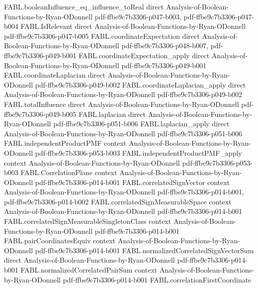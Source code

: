 \begin{theorem}
\proofstep
  {FABL.booleanInfluence_eq_influence_toReal}
  {direct}
  {Analysis-of-Boolean-Functions-by-Ryan-ODonnell}
  {pdf-ffbe9c7b3306-p047-b003,
    pdf-ffbe9c7b3306-p047-b004}
\proofstep
  {FABL.IsRelevant}
  {direct}
  {Analysis-of-Boolean-Functions-by-Ryan-ODonnell}
  {pdf-ffbe9c7b3306-p047-b005}
\proofstep
  {FABL.coordinateExpectation}
  {direct}
  {Analysis-of-Boolean-Functions-by-Ryan-ODonnell}
  {pdf-ffbe9c7b3306-p048-b007,
    pdf-ffbe9c7b3306-p049-b001}
\proofstep
  {FABL.coordinateExpectation_apply}
  {direct}
  {Analysis-of-Boolean-Functions-by-Ryan-ODonnell}
  {pdf-ffbe9c7b3306-p049-b001}
\proofstep
  {FABL.coordinateLaplacian}
  {direct}
  {Analysis-of-Boolean-Functions-by-Ryan-ODonnell}
  {pdf-ffbe9c7b3306-p049-b002}
\proofstep
  {FABL.coordinateLaplacian_apply}
  {direct}
  {Analysis-of-Boolean-Functions-by-Ryan-ODonnell}
  {pdf-ffbe9c7b3306-p049-b002}
\proofstep
  {FABL.totalInfluence}
  {direct}
  {Analysis-of-Boolean-Functions-by-Ryan-ODonnell}
  {pdf-ffbe9c7b3306-p049-b005}
\proofstep
  {FABL.laplacian}
  {direct}
  {Analysis-of-Boolean-Functions-by-Ryan-ODonnell}
  {pdf-ffbe9c7b3306-p051-b006}
\proofstep
  {FABL.laplacian_apply}
  {direct}
  {Analysis-of-Boolean-Functions-by-Ryan-ODonnell}
  {pdf-ffbe9c7b3306-p051-b006}
\proofstep
  {FABL.independentProductPMF}
  {context}
  {Analysis-of-Boolean-Functions-by-Ryan-ODonnell}
  {pdf-ffbe9c7b3306-p053-b003}
\proofstep
  {FABL.independentProductPMF_apply}
  {context}
  {Analysis-of-Boolean-Functions-by-Ryan-ODonnell}
  {pdf-ffbe9c7b3306-p053-b003}
\proofstep
  {FABL.CorrelationPlane}
  {context}
  {Analysis-of-Boolean-Functions-by-Ryan-ODonnell}
  {pdf-ffbe9c7b3306-p014-b001}
\proofstep
  {FABL.correlatedSignVector}
  {context}
  {Analysis-of-Boolean-Functions-by-Ryan-ODonnell}
  {pdf-ffbe9c7b3306-p014-b001,
    pdf-ffbe9c7b3306-p014-b002}
\proofstep
  {FABL.correlatedSignMeasurableSpace}
  {context}
  {Analysis-of-Boolean-Functions-by-Ryan-ODonnell}
  {pdf-ffbe9c7b3306-p014-b001}
\proofstep
  {FABL.correlatedSignMeasurableSingletonClass}
  {context}
  {Analysis-of-Boolean-Functions-by-Ryan-ODonnell}
  {pdf-ffbe9c7b3306-p014-b001}
\proofstep
  {FABL.pairCoordinatesEquiv}
  {context}
  {Analysis-of-Boolean-Functions-by-Ryan-ODonnell}
  {pdf-ffbe9c7b3306-p014-b001}
\proofstep
  {FABL.normalizedCorrelatedSignVectorSum}
  {direct}
  {Analysis-of-Boolean-Functions-by-Ryan-ODonnell}
  {pdf-ffbe9c7b3306-p014-b001}
\proofstep
  {FABL.normalizedCorrelatedPairSum}
  {context}
  {Analysis-of-Boolean-Functions-by-Ryan-ODonnell}
  {pdf-ffbe9c7b3306-p014-b001}
\proofstep
  {FABL.correlationFirstCoordinate}

\end{theorem}
